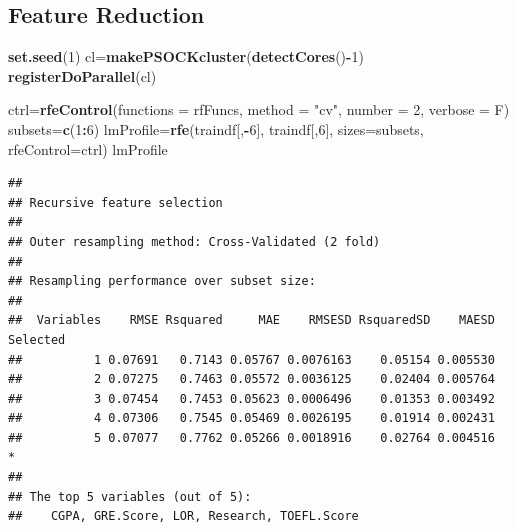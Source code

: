 \documentclass[11pt,]{article}
\newenvironment{Shaded}{\begin{snugshade}}{\end{snugshade}}
\newcommand{\CommentTok}[1]{\textcolor[rgb]{0.56,0.35,0.01}{\textit{#1}}}
\newcommand{\DataTypeTok}[1]{\textcolor[rgb]{0.13,0.29,0.53}{#1}}
\newcommand{\DecValTok}[1]{\textcolor[rgb]{0.00,0.00,0.81}{#1}}
\newcommand{\KeywordTok}[1]{\textcolor[rgb]{0.13,0.29,0.53}{\textbf{#1}}}
\newcommand{\NormalTok}[1]{#1}
\newcommand{\OperatorTok}[1]{\textcolor[rgb]{0.81,0.36,0.00}{\textbf{#1}}}
\newcommand{\StringTok}[1]{\textcolor[rgb]{0.31,0.60,0.02}{#1}}
\begin{document}
\begin{Shaded}
\end{Shaded}

\hypertarget{feature-reduction}{%
\subsection{Feature Reduction}\label{feature-reduction}}

\begin{Shaded}
\begin{Highlighting}[]
\KeywordTok{set.seed}\NormalTok{(}\DecValTok{1}\NormalTok{)}
\NormalTok{cl=}\KeywordTok{makePSOCKcluster}\NormalTok{(}\KeywordTok{detectCores}\NormalTok{()}\OperatorTok{-}\DecValTok{1}\NormalTok{)}
\KeywordTok{registerDoParallel}\NormalTok{(cl)}
 
\NormalTok{ctrl=}\KeywordTok{rfeControl}\NormalTok{(}\DataTypeTok{functions =}\NormalTok{ rfFuncs,}
           \DataTypeTok{method =} \StringTok{"cv"}\NormalTok{,}
           \DataTypeTok{number =} \DecValTok{2}\NormalTok{,}
           \DataTypeTok{verbose =}\NormalTok{ F)}
\NormalTok{subsets=}\KeywordTok{c}\NormalTok{(}\DecValTok{1}\OperatorTok{:}\DecValTok{6}\NormalTok{)}
\NormalTok{lmProfile=}\KeywordTok{rfe}\NormalTok{(traindf[,}\OperatorTok{-}\DecValTok{6}\NormalTok{], traindf[,}\DecValTok{6}\NormalTok{], }\DataTypeTok{sizes=}\NormalTok{subsets, }\DataTypeTok{rfeControl=}\NormalTok{ctrl)}
\NormalTok{lmProfile}
\end{Highlighting}
\end{Shaded}

\begin{verbatim}
## 
## Recursive feature selection
## 
## Outer resampling method: Cross-Validated (2 fold) 
## 
## Resampling performance over subset size:
## 
##  Variables    RMSE Rsquared     MAE    RMSESD RsquaredSD    MAESD Selected
##          1 0.07691   0.7143 0.05767 0.0076163    0.05154 0.005530         
##          2 0.07275   0.7463 0.05572 0.0036125    0.02404 0.005764         
##          3 0.07454   0.7453 0.05623 0.0006496    0.01353 0.003492         
##          4 0.07306   0.7545 0.05469 0.0026195    0.01914 0.002431         
##          5 0.07077   0.7762 0.05266 0.0018916    0.02764 0.004516        *
## 
## The top 5 variables (out of 5):
##    CGPA, GRE.Score, LOR, Research, TOEFL.Score
\end{verbatim}
\end{document}
